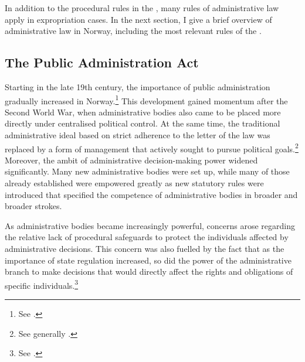 
In addition to the procedural rules in the \cite{ea59}, many rules of administrative law apply in expropriation cases. In the next section, I give a brief overview of administrative law in Norway, including the most relevant rules of the \cite{paa67}.

\subsection{The Public Administration Act}\label{sec:paa67}

Starting in the late 19th century, the importance of public administration gradually increased in Norway.\footnote{See \cite[8-12]{nut58}.} This development gained momentum after the Second World War, when administrative bodies also came to be placed more directly under centralised political control. At the same time, the traditional administrative ideal based on strict adherence to the letter of the law was replaced by a form of management that actively sought to pursue political goals.\footnote{See generally \cite{gronlie00}.} Moreover, the ambit of administrative decision-making power widened significantly. Many new administrative bodies were set up, while many of those already established were empowered greatly as new statutory rules were introduced that specified the competence of administrative bodies in broader and broader strokes.

As administrative bodies became increasingly powerful, concerns arose regarding the relative lack of procedural safeguards to protect the individuals affected by administrative decisions. This concern was also fuelled by the fact that as the importance of state regulation increased, so did the power of the administrative branch to make decisions that would directly affect the rights and obligations of specific individuals.\footnote{See \cite[12-16]{nut58}.}

